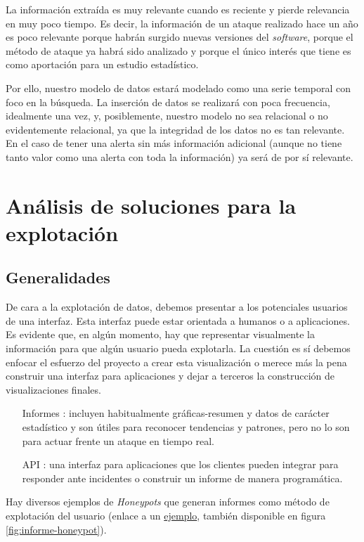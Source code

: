 La información extraída es muy relevante cuando es reciente y pierde relevancia en muy poco tiempo. Es decir, la información de un ataque realizado
hace un año es poco relevante porque habrán surgido nuevas versiones del \emph{software}, porque el método de ataque ya habrá sido analizado y porque el único interés
que tiene es como aportación para un estudio estadístico.

Por ello, nuestro modelo de datos estará modelado como una serie temporal con foco en la búsqueda. La inserción de datos se realizará con poca frecuencia, idealmente una vez,
y, posiblemente, nuestro modelo no sea relacional o no evidentemente relacional, ya que la integridad de los datos no es tan relevante.
En el caso de tener una alerta sin más información adicional (aunque no tiene tanto valor como una alerta con toda la información) ya será de por sí relevante.

\section{Análisis de soluciones para la explotación}

\subsection{Generalidades}

De cara a la explotación de datos, debemos presentar a los potenciales usuarios de una interfaz. Esta interfaz puede estar
orientada a humanos o a aplicaciones. Es evidente que, en algún momento, hay que representar visualmente la información para que algún usuario pueda explotarla.
La cuestión es sí debemos enfocar el esfuerzo del proyecto a crear esta visualización o merece más la pena construir
una interfaz para aplicaciones y dejar a terceros la construcción de visualizaciones finales.

\begin{enumerate}
    \item[Informes]: incluyen habitualmente gráficas-resumen y datos de carácter estadístico y son útiles para reconocer tendencias y patrones, pero no lo son para actuar frente un ataque en tiempo real.
    \item[API]: una interfaz para aplicaciones que los clientes pueden integrar para responder ante incidentes o construir un informe de manera programática.
\end{enumerate}

Hay diversos ejemplos de \emph{Honeypots} que generan informes como método de explotación del usuario (enlace a un \href{http://www.nothink.org/honeypot_ssh.php}{ejemplo}, también disponible en figura \ref{fig:informe-honeypot}).

